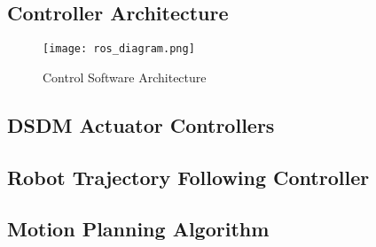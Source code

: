\subsection{Controller Architecture}

\begin{figure}[H]
	\centering
		\texttt{[image: ros\_diagram.png]}
	\caption{Control Software Architecture}
	\label{fig:ros_diagram}
\end{figure}



\subsection{DSDM Actuator Controllers}

\subsection{Robot Trajectory Following Controller}

\subsection{Motion Planning Algorithm}

